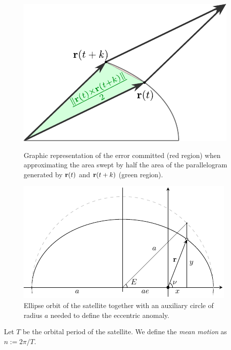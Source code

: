 \documentclass[../main.tex]{subfiles}
\begin{document}
\begin{figure}[htbp]
  \centering
  \begin{minipage}[ht]{0.48\textwidth}
    \centering
    \includegraphics[width=\textwidth]{Images/areal_velocity.pdf}
    \caption{Graphic representation of the error committed (red region) when approximating the area swept by half the area of the parallelogram generated by $\boldsymbol{\mathrm{r}}(t)$ and $\boldsymbol{\mathrm{r}}(t+k)$ (green region).}
    \label{fig:areal_vel}
  \end{minipage}
  \hfill
  \begin{minipage}[ht]{0.48\textwidth}
    \centering
    \includegraphics[width=\textwidth]{Images/kepler_eq.pdf}
    \caption{Ellipse orbit of the satellite together with an auxiliary circle of radius $a$ needed to define the eccentric anomaly.}
    \label{fig:kepler_eq}
  \end{minipage}
\end{figure}
\begin{definition}
  Let $T$ be the orbital period of the satellite. We define the \emph{mean motion} as $n:=2\pi/T$.
\end{definition}
\end{document}
